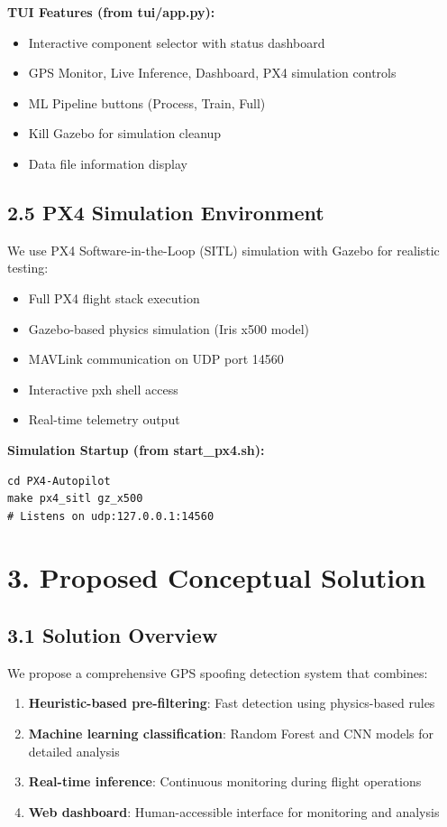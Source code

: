 \documentclass[12pt,a4paper]{article}
\begin{document}
\textbf{TUI Features (from tui/app.py):}
\begin{itemize}
    \item Interactive component selector with status dashboard
    \item GPS Monitor, Live Inference, Dashboard, PX4 simulation controls
    \item ML Pipeline buttons (Process, Train, Full)
    \item Kill Gazebo for simulation cleanup
    \item Data file information display
\end{itemize}

\subsection{2.5 PX4 Simulation Environment}

We use PX4 Software-in-the-Loop (SITL) simulation with Gazebo for realistic testing:

\begin{itemize}
    \item Full PX4 flight stack execution
    \item Gazebo-based physics simulation (Iris x500 model)
    \item MAVLink communication on UDP port 14560
    \item Interactive pxh shell access
    \item Real-time telemetry output
\end{itemize}

\textbf{Simulation Startup (from start\_px4.sh):}
\begin{verbatim}
cd PX4-Autopilot
make px4_sitl gz_x500
# Listens on udp:127.0.0.1:14560
\end{verbatim}

\newpage

\section{3. Proposed Conceptual Solution}

\subsection{3.1 Solution Overview}

We propose a comprehensive GPS spoofing detection system that combines:

\begin{enumerate}
    \item \textbf{Heuristic-based pre-filtering}: Fast detection using physics-based rules
    \item \textbf{Machine learning classification}: Random Forest and CNN models for detailed analysis
    \item \textbf{Real-time inference}: Continuous monitoring during flight operations
    \item \textbf{Web dashboard}: Human-accessible interface for monitoring and analysis
\end{enumerate}
\end{document}
